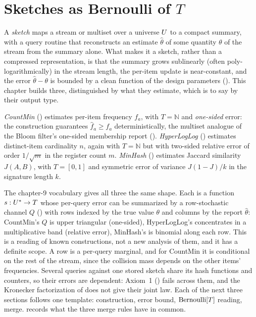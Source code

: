 %

\section{Sketches as Bernoulli of \texorpdfstring{$T$}{T}}
\label{sec:sketches-as-bernoulli}

A \emph{sketch} maps a stream or multiset over a universe
$U$ to a compact summary, with a query routine that reconstructs an estimate
$\hat\theta$ of some quantity $\theta$ of the stream from the summary alone.
What makes it a sketch, rather than a compressed representation, is that the
summary grows sublinearly (often poly-logarithmically) in the stream length,
the per-item update is near-constant, and the error $\hat\theta - \theta$ is
bounded by a clean function of the design parameters
(). This chapter builds three, distinguished by
what they estimate, which is to say by their output type.

\emph{CountMin} () estimates
per-item frequency $f_a$, with $T = \mathbb{N}$ and \emph{one-sided}
error: the construction guarantees
$\hat f_a \ge f_a$ deterministically, the multiset analogue of the Bloom
filter's one-sided membership report ().
\emph{HyperLogLog} () estimates distinct-item cardinality
$n$, again with $T = \mathbb{N}$ but with two-sided relative error of order
$1/\sqrt{m}$ in the register count $m$. \emph{MinHash} ()
estimates Jaccard similarity $J(A,B)$, with $T = [0,1]$ and symmetric error of
variance $J(1-J)/k$ in the signature length $k$.

The chapter-9 vocabulary gives all three the same shape. Each is a function
$s : U^* \to T$ whose per-query error can be summarized by a
row-stochastic channel $Q$ () with rows indexed by the
true value $\theta$ and columns by the report $\hat\theta$: CountMin's $Q$ is
upper triangular (one-sided), HyperLogLog's concentrates in a multiplicative
band (relative error), MinHash's is binomial along each row. This is a reading
of known constructions, not a new analysis of them, and it has a definite scope.
A row is a per-query marginal, and for CountMin it is conditional on the rest of
the stream, since the collision mass depends on the other items' frequencies.
Several queries against one stored sketch share its hash functions and counters,
so their errors are dependent: Axiom~1 () fails across
them, and the Kronecker factorization of  does not give
their joint law. Each of the next three sections follows one template:
construction, error bound, $\mathrm{Bernoulli}[T]$ reading, merge.
 records what the three merge rules have in common.
